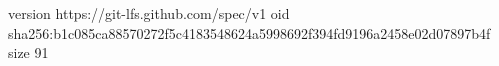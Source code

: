 version https://git-lfs.github.com/spec/v1
oid sha256:b1c085ca88570272f5c4183548624a5998692f394fd9196a2458e02d07897b4f
size 91
